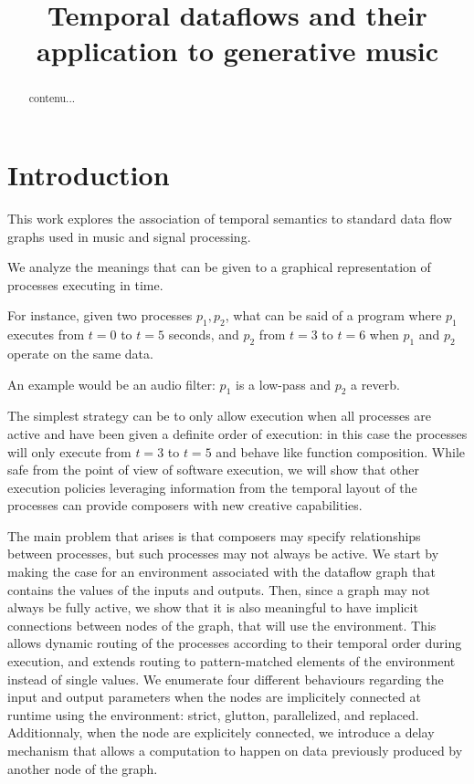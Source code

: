 \documentclass{article}
\title{Temporal dataflows and their application to generative music}
\begin{document}
    
    \capstartfalse
    \maketitle
    \capstarttrue
    \begin{abstract}
        contenu...
    \end{abstract}
    
    \section{Introduction}
    This work explores the association of temporal semantics to standard data flow graphs used in music and signal processing.
    
    We analyze the meanings that can be given to a graphical representation of processes executing in time. 
    
    For instance, given two processes $p_1, p_2$, what can be said of a program where $p_1$ executes from $t=0$ to $t=5$ seconds, and $p_2$ from $t=3$ to $t=6$ when $p_1$ and $p_2$ operate on the same data.
    
    An example would be an audio filter: $p_1$ is a low-pass and $p_2$ a reverb.
    
    The simplest strategy can be to only allow execution when all processes are active and have been given a definite order of execution: in this case the processes will only execute from $t=3$ to $t=5$ and behave like function composition. 
    While safe from the point of view of software execution, we will show that other execution policies leveraging information from the temporal layout of the processes can provide composers with new creative capabilities.
    
    The main problem that arises is that composers may specify relationships between processes, but such processes may not always be active. 
    We start by making the case for an environment associated with the dataflow graph that contains the values of the inputs and outputs.
    Then, since a graph may not always be fully active, we show that it is also meaningful to have implicit connections between nodes of the graph, that will use the environment.
    This allows dynamic routing of the processes according to their temporal order during execution, and extends routing to pattern-matched elements of the environment instead of single values.
    We enumerate four different behaviours regarding the input and output parameters when the nodes are implicitely connected at runtime using the environment: strict, glutton, parallelized, and replaced. 
    Additionnaly, when the node are explicitely connected, we introduce a delay mechanism that allows a computation to happen on data previously produced by another node of the graph.
    
\end{document}
